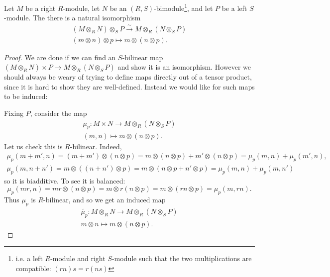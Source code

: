 \documentclass[12pt]{article}
\begin{document}
\begin{proposition}
	Let $M$ be a right $R$-module, let $N$ be an $(R,S)$-bimodule\footnote{i.e. a left $R$-module and right $S$-module such that the two multiplications are compatible: $(rn)s=r(ns)$}, and let $P$ be a left $S$-module. The there is a natural isomorphism  
	\begin{gather*}
		(M\otimes_R N)\otimes_S P \overset{\sim}{\to} M\otimes_R (N\otimes_S P) \\
		(m\otimes n)\otimes p \mapsto m\otimes(n\otimes p).
	\end{gather*}
\end{proposition}
\begin{proof}
	We are done if we can find an $S$-bilinear map $(M\otimes_R N) \times P \to M\otimes_R (N\otimes_S P)$ and show it is an isomorphism. However we should always be weary of trying to define maps directly out of a tensor product, since it is hard to show they are well-defined. Instead we would like for such maps to be induced:

	Fixing $P$, consider the map 
	\begin{gather*}
		\mu_p:M\times N \to M\otimes_R(N\otimes_S P) \\
		(m,n) \mapsto m\otimes (n\otimes p).
	\end{gather*}
	Let us check this is $R$-bilinear. Indeed, 
	\begin{gather*}
		\mu_p(m+m',n)=(m+m')\otimes (n\otimes p) = m\otimes (n\otimes p) + m'\otimes(n\otimes p) = \mu_p(m,n)+\mu_p(m',n), \\
		\mu_p(m,n+n') = m\otimes ((n+n')\otimes p) = m\otimes (n\otimes p + n'\otimes p) = \mu_p(m,n)+\mu_p(m,n')
	\end{gather*}
	so it is biadditive. To see it is balanced:
	\begin{equation*}
		\mu_p(mr,n) = mr\otimes (n\otimes p) = m\otimes r(n\otimes p) = m\otimes (rn\otimes p) = \mu_p(m,rn).
	\end{equation*}
	Thus $\mu_p$ is $R$-bilinear, and so we get an induced map 
	\begin{gather*}
		\tilde{\mu_p}:M\otimes_R N\to M\otimes_R (N\otimes_S P) \\
		m\otimes n \mapsto m\otimes (n\otimes p).
	\end{gather*}


\end{proof}
\end{document}
